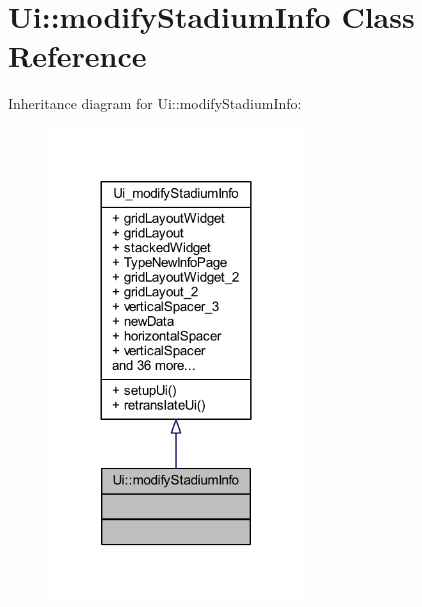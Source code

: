\hypertarget{class_ui_1_1modify_stadium_info}{}\section{Ui\+:\+:modify\+Stadium\+Info Class Reference}
\label{class_ui_1_1modify_stadium_info}


Inheritance diagram for Ui\+:\+:modify\+Stadium\+Info\+:\nopagebreak
\begin{figure}[H]
\begin{center}
\leavevmode
\includegraphics[width=192pt]{class_ui_1_1modify_stadium_info__inherit__graph}
\end{center}
\end{figure}


